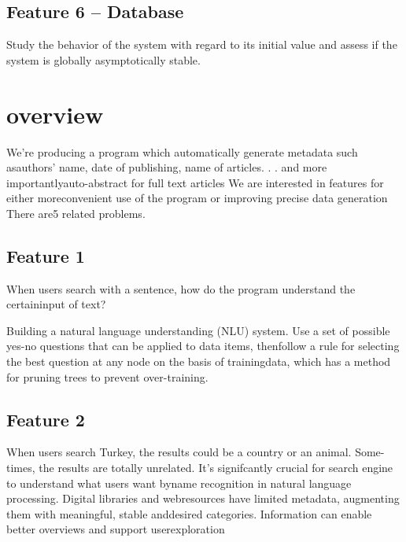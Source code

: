 \documentclass[a4paper]{article} %
\begin{document}
	\subsection*{Feature 6 -- Database}
	\label{task1:feature6}
	
	Study the behavior of the system with regard to its initial value and assess if the system is globally asymptotically stable.
	
	
	
	\section*{overview}
	\label{task1}
	We're  producing  a  program  which  automatically  generate  metadata  such  asauthors' name,  date of publishing,  name of articles. . .   and more importantlyauto-abstract for full text articles We are interested in features for either moreconvenient use of the program or improving precise data generation There are5 related problems.
	
	
	\subsection*{Feature 1 }
	\label{task1:feature1}
	When users search with a sentence, how do the program understand the certaininput of text?
	
	Building a natural language understanding (NLU) system.
	Use a set of possible yes-no questions that can be applied to data items, thenfollow a rule for selecting the best question at any node on the basis of trainingdata, which has a method for pruning trees to prevent over-training.
	
	\subsection*{Feature 2 }
	\label{task1:feature2}
	
	When users search Turkey, the results could be a country or an animal.  Some-times, the results are totally unrelated.
	It's  signifcantly  crucial  for  search  engine  to  understand  what  users  want  byname  recognition  in  natural  language  processing.   Digital  libraries  and  webresources have limited metadata, augmenting them with meaningful, stable anddesired categories.  Information can enable better overviews and support userexploration
\end{document}
